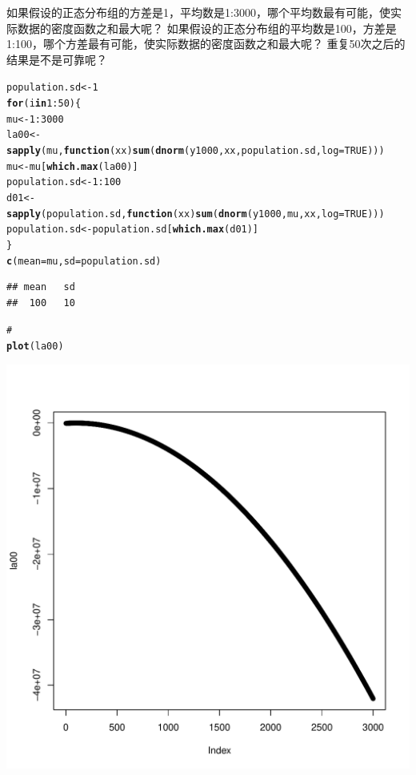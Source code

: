 \documentclass{article}\usepackage[]{graphicx}\usepackage[]{color}
\makeatletter
\def\maxwidth{ %
  \ifdim\Gin@nat@width>\linewidth
    \linewidth
  \else
    \Gin@nat@width
  \fi
}
\newcommand{\hlnum}[1]{\textcolor[rgb]{0.686,0.059,0.569}{#1}}%
\newcommand{\hlcom}[1]{\textcolor[rgb]{0.678,0.584,0.686}{\textit{#1}}}%
\newcommand{\hlopt}[1]{\textcolor[rgb]{0,0,0}{#1}}%
\newcommand{\hlstd}[1]{\textcolor[rgb]{0.345,0.345,0.345}{#1}}%
\newcommand{\hlkwa}[1]{\textcolor[rgb]{0.161,0.373,0.58}{\textbf{#1}}}%
\newcommand{\hlkwb}[1]{\textcolor[rgb]{0.69,0.353,0.396}{#1}}%
\newcommand{\hlkwc}[1]{\textcolor[rgb]{0.333,0.667,0.333}{#1}}%
\newcommand{\hlkwd}[1]{\textcolor[rgb]{0.737,0.353,0.396}{\textbf{#1}}}%
\newenvironment{kframe}{%
 \def\at@end@of@kframe{}%
 \ifinner\ifhmode%
  \def\at@end@of@kframe{\end{minipage}}%
  \begin{minipage}{\columnwidth}%
 \fi\fi%
 \def\FrameCommand##1{\hskip\@totalleftmargin \hskip-\fboxsep
 \colorbox{shadecolor}{##1}\hskip-\fboxsep
     \hskip-\linewidth \hskip-\@totalleftmargin \hskip\columnwidth}%
 \MakeFramed {\advance\hsize-\width
   \@totalleftmargin\z@ \linewidth\hsize
   \@setminipage}}%
 {\par\unskip\endMakeFramed%
 \at@end@of@kframe}
\newenvironment{knitrout}{}{} %
\makeatother
\begin{document}
如果假设的正态分布组的方差是1，平均数是1:3000，哪个平均数最有可能，使实际数据的密度函数之和最大呢？
如果假设的正态分布组的平均数是100，方差是1:100，哪个方差最有可能，使实际数据的密度函数之和最大呢？
重复50次之后的结果是不是可靠呢？
\begin{knitrout}
\color{fgcolor}\begin{kframe}
\begin{alltt}
\hlstd{population.sd} \hlkwb{<-} \hlnum{1}
\hlkwa{for} \hlstd{(i} \hlkwa{in} \hlnum{1}\hlopt{:}\hlnum{50}\hlstd{) \{}
    \hlstd{mu} \hlkwb{<-} \hlnum{1}\hlopt{:}\hlnum{3000}
    \hlstd{la00} \hlkwb{<-} \hlkwd{sapply}\hlstd{(mu,} \hlkwa{function}\hlstd{(}\hlkwc{xx}\hlstd{)} \hlkwd{sum}\hlstd{(}\hlkwd{dnorm}\hlstd{(y1000, xx, population.sd,} \hlkwc{log} \hlstd{=} \hlnum{TRUE}\hlstd{)))}
    \hlstd{mu} \hlkwb{<-} \hlstd{mu[}\hlkwd{which.max}\hlstd{(la00)]}
    \hlstd{population.sd} \hlkwb{<-} \hlnum{1}\hlopt{:}\hlnum{100}
    \hlstd{d01} \hlkwb{<-} \hlkwd{sapply}\hlstd{(population.sd,} \hlkwa{function}\hlstd{(}\hlkwc{xx}\hlstd{)} \hlkwd{sum}\hlstd{(}\hlkwd{dnorm}\hlstd{(y1000, mu, xx,} \hlkwc{log} \hlstd{=} \hlnum{TRUE}\hlstd{)))}
    \hlstd{population.sd} \hlkwb{<-} \hlstd{population.sd[}\hlkwd{which.max}\hlstd{(d01)]}
\hlstd{\}}
\hlkwd{c}\hlstd{(}\hlkwc{mean} \hlstd{= mu,} \hlkwc{sd} \hlstd{= population.sd)}
\end{alltt}
\begin{verbatim}
## mean   sd 
##  100   10
\end{verbatim}
\begin{alltt}
\hlcom{# }
\hlkwd{plot}\hlstd{(la00)}
\end{alltt}
\end{kframe}
\includegraphics[width=\maxwidth]{figure/unnamed-chunk-31} 

\end{knitrout}
\end{document}
